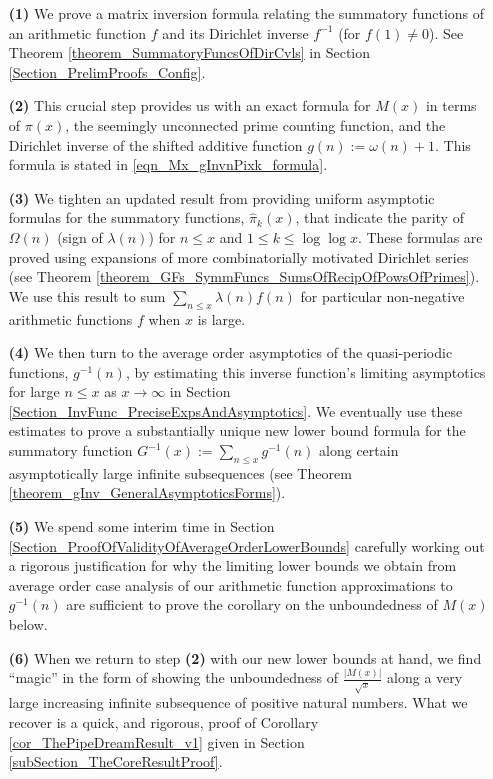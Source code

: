 \documentclass[11pt,reqno,a4letter]{article}
\numberwithin{figure}{section}
\numberwithin{table}{section}
\theoremstyle{plain}
\numberwithin{theorem}{section}
\theoremstyle{definition}
\begin{document}
\begin{itemize} 

\item[\textbf{(1)}] We prove a matrix inversion formula relating the summatory 
           functions of an arithmetic function $f$ and its Dirichlet inverse $f^{-1}$ (for $f(1) \neq 0$). 
           See 
           Theorem \ref{theorem_SummatoryFuncsOfDirCvls} in 
           Section \ref{Section_PrelimProofs_Config}.  
\item[\textbf{(2)}] This crucial step provides us with an exact formula for $M(x)$ in terms of $\pi(x)$, the seemingly 
           unconnected prime counting function, and the 
           Dirichlet inverse of the shifted additive function $g(n) := \omega(n) + 1$. This 
           formula is stated in \eqref{eqn_Mx_gInvnPixk_formula}.  
\item[\textbf{(3)}] We tighten an updated result from \cite[\S 7]{MV} providing uniform asymptotic formulas for the  
           summatory functions, $\widehat{\pi}_k(x)$, that indicate the parity of 
           $\Omega(n)$ (sign of $\lambda(n)$) 
           for $n \leq x$ and $1 \leq k \leq \log\log x$. These formulas are proved using expansions of 
           more combinatorially motivated Dirichlet series 
           (see Theorem \ref{theorem_GFs_SymmFuncs_SumsOfRecipOfPowsOfPrimes}). 
           We use this result to sum $\sum_{n \leq x} \lambda(n) f(n)$ for particular non-negative arithmetic 
           functions $f$ when $x$ is large. 
\item[\textbf{(4)}] We then turn to the average order 
           asymptotics of the quasi-periodic functions, $g^{-1}(n)$, by estimating this inverse function's 
           limiting asymptotics for large $n \leq x$ as $x \rightarrow \infty$ in 
           Section \ref{Section_InvFunc_PreciseExpsAndAsymptotics}. 
           We eventually use these estimates to prove a substantially unique new lower bound formula 
           for the summatory function $G^{-1}(x) := \sum_{n \leq x} g^{-1}(n)$ along certain asymptotically large 
           infinite subsequences (see Theorem \ref{theorem_gInv_GeneralAsymptoticsForms}). 
\item[\textbf{(5)}] We spend some interim time in Section \ref{Section_ProofOfValidityOfAverageOrderLowerBounds} 
           carefully working out a rigorous justification for why the limiting lower bounds we obtain from average 
           order case analysis of our arithmetic function approximations 
           to $g^{-1}(n)$ are sufficient to prove the corollary on the unboundedness of $M(x)$ below. 
\item[\textbf{(6)}] When we return to step \textbf{(2)} 
           with our new lower bounds at hand, we find ``magic'' in the form of 
           showing the unboundedness of $\frac{|M(x)|}{\sqrt{x}}$ 
           along a very large increasing infinite subsequence 
           of positive natural numbers. What we recover is a quick, and rigorous, proof of 
           Corollary \ref{cor_ThePipeDreamResult_v1} given in 
           Section \ref{subSection_TheCoreResultProof}. 
           
\end{itemize} 
\end{document}
